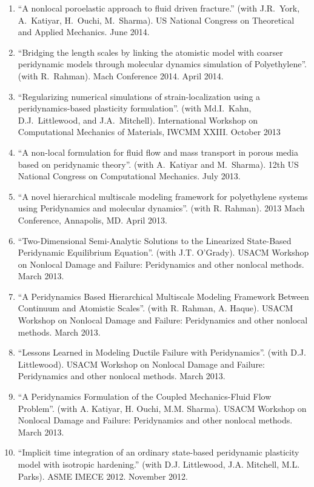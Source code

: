 \begin{etaremune}
\begin{enumerate}
    \item ``A nonlocal poroelastic approach to fluid driven fracture.'' (with J.R.~York, A.~Katiyar, H.~Ouchi, M.~Sharma). US National Congress on Theoretical and Applied Mechanics.  June 2014.
    \item ``Bridging the length scales by linking the atomistic model with coarser peridynamic models through molecular dynamics simulation of Polyethylene''. (with R.~Rahman). Mach Conference 2014.  April 2014.
    \item ``Regularizing numerical simulations of strain-localization using a peridynamics-based plasticity formulation''. (with Md.I.~Kahn, D.J.~Littlewood, and J.A.~Mitchell). International Workshop on Computational Mechanics of Materials, IWCMM XXIII. October 2013
    \item ``A non-local formulation for fluid flow and mass transport in porous media based on peridynamic theory''. (with A.~Katiyar and M.~Sharma). 12th US National Congress on Computational Mechanics. July 2013.
    \item ``A novel hierarchical multiscale modeling framework for polyethylene systems using Peridynamics and molecular dynamics''. (with R. Rahman). 2013 Mach Conference, Annapolis, MD. April 2013. 
    \item ``Two-Dimensional Semi-Analytic Solutions to the Linearized State-Based Peridynamic Equilibrium Equation''. (with J.T. O'Grady). USACM Workshop on Nonlocal Damage and Failure: Peridynamics and other nonlocal methods. March 2013.
    \item ``A Peridynamics Based Hierarchical Multiscale Modeling Framework Between Continuum and Atomistic Scales''. (with R. Rahman, A. Haque). USACM Workshop on Nonlocal Damage and Failure: Peridynamics and other nonlocal methods. March 2013.
    \item ``Lessons Learned in Modeling Ductile Failure with Peridynamics''. (with D.J. Littlewood). USACM Workshop on Nonlocal Damage and Failure: Peridynamics and other nonlocal methods. March 2013.
    \item ``A Peridynamics Formulation of the Coupled Mechanics-Fluid Flow Problem''. (with A. Katiyar, H. Ouchi, M.M. Sharma). USACM Workshop on Nonlocal Damage and Failure: Peridynamics and other nonlocal methods. March 2013.
    \item ``Implicit time integration of an ordinary state-based peridynamic plasticity model with isotropic hardening.'' (with D.J. Littlewood, J.A. Mitchell, M.L. Parks).  ASME IMECE 2012.  November 2012.

\end{enumerate}
\end{etaremune}
